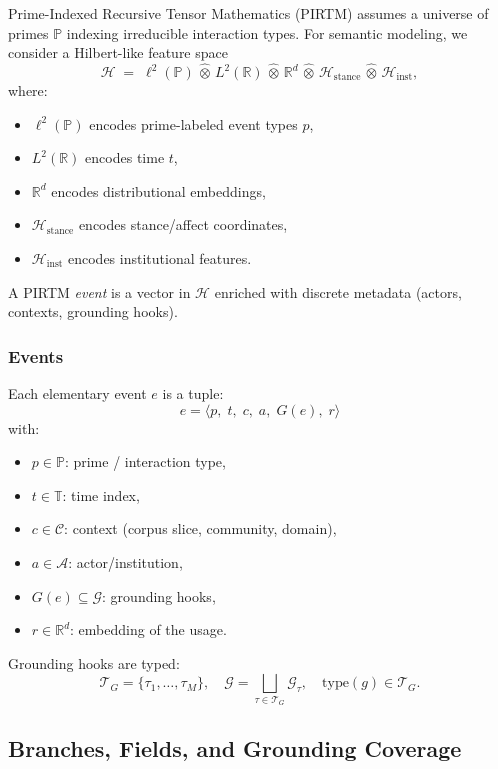 \documentclass[11pt, a4paper]{article}
\begin{document}
Prime-Indexed Recursive Tensor Mathematics (PIRTM) assumes a universe of primes $\mathbb{P}$ indexing irreducible interaction types.
For semantic modeling, we consider a Hilbert-like feature space
\[
\mathcal{H}
  \;=\;
  \ell^2(\mathbb{P})
  \,\widehat{\otimes}\,
  L^2(\mathbb{R})
  \,\widehat{\otimes}\,
  \mathbb{R}^d
  \,\widehat{\otimes}\,
  \mathcal{H}_{\text{stance}}
  \,\widehat{\otimes}\,
  \mathcal{H}_{\text{inst}},
\]
where:
\begin{itemize}[nosep]
  \item $\ell^2(\mathbb{P})$ encodes prime-labeled event types $p$,
  \item $L^2(\mathbb{R})$ encodes time $t$,
  \item $\mathbb{R}^d$ encodes distributional embeddings,
  \item $\mathcal{H}_{\text{stance}}$ encodes stance/affect coordinates,
  \item $\mathcal{H}_{\text{inst}}$ encodes institutional features.
\end{itemize}

A PIRTM \emph{event} is a vector in $\mathcal{H}$ enriched with discrete metadata (actors, contexts, grounding hooks).

\subsubsection*{Events}

Each elementary event $e$ is a tuple:
\[
e
=
\langle
  p,\;
  t,\;
  c,\;
  a,\;
  G(e),\;
  r
\rangle
\]
with:
\begin{itemize}[nosep]
  \item $p \in \mathbb{P}$: prime / interaction type,
  \item $t \in \mathbb{T}$: time index,
  \item $c \in \mathcal{C}$: context (corpus slice, community, domain),
  \item $a \in \mathcal{A}$: actor/institution,
  \item $G(e) \subseteq \mathcal{G}$: grounding hooks,
  \item $r \in \mathbb{R}^d$: embedding of the usage.
\end{itemize}

Grounding hooks are typed:
\[
\mathcal{T}_G = \{\tau_1,\dots,\tau_M\}, \quad
\mathcal{G} = \bigsqcup_{\tau \in \mathcal{T}_G} \mathcal{G}_\tau, \quad
\mathrm{type}(g) \in \mathcal{T}_G.
\]

\subsection{Branches, Fields, and Grounding Coverage}
\end{document}
